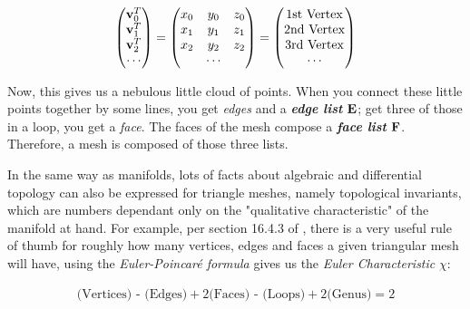 \begin{align*}
\begin{pmatrix}
\bf{v}^T_0\\
\bf{v}^T_1\\
\bf{v}^T_2 \\
\cdots
\end{pmatrix}
=
\begin{pmatrix}
x_0 &  y_0&  z_0\\
x_1 &  y_1&  z_1\\
x_2 &  y_2&  z_2 \\
&\cdots
\end{pmatrix}
=
\begin{pmatrix}
\text{1st Vertex}\\
\text{2nd Vertex}\\
\text{3rd Vertex}\\
\cdots
\end{pmatrix}
\end{align*}

Now, this gives us a nebulous little cloud of points. When you connect 
these little points together by some lines, you get \emph{edges} and a
\textit{\textbf{edge list}} $\bf{E}$;
get three of those in a loop, you get a \emph{face}. The faces of
the mesh compose a \emph{\textbf{face list}} $\bf{F}$. Therefore,
a mesh is composed of those three lists. 

\spa

In the same way as manifolds, lots of facts about algebraic and differential
topology can also be expressed for triangle meshes, namely 
topological invariants, which are numbers dependant only on the 
"qualitative characteristic" of the manifold at hand.
For example, per section 16.4.3 of \cite{realtime}, there is a very useful 
rule of thumb for roughly how many vertices, edges and faces a given triangular 
mesh will have, using the \emph{Euler-Poincaré formula} gives us
the \textit{Euler Characteristic} $\chi$:

\begin{definition}
    \begin{align*}
    \text{(Vertices) - (Edges)} + 2\text{(Faces) - (Loops)} + 2\text{(Genus)} = 2
\end{align*}
\end{definition}

